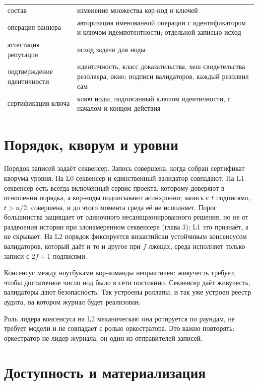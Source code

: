 \begin{center}
\begin{tabular}{p{3.4cm} p{10.2cm}}
состав & изменение множества кор-нод и ключей \\
операция раннера & авторизация именованной операции с идентификатором и ключом идемпотентности; отдельной записью исход \\
аттестация репутации & исход задачи для ноды \\
подтверждение идентичности & идентичность, класс доказательства, хеш свидетельства резолвера, окно; подписи валидаторов, каждый резолвил сам \\
сертификация ключа & ключ ноды, подписанный ключом идентичности, с началом и концом действия \\
\bottomrule
\end{tabular}
\end{center}

\section{Порядок, кворум и уровни}

Порядок записей задаёт секвенсер. Запись совершена, когда собран сертификат кворума уровня. На L0 секвенсер и единственный валидатор совпадают. На L1 секвенсер есть всегда включённый сервис проекта, которому доверяют в отношении порядка, а кор-ноды подписывают асинхронно; запись с $t$ подписями, $t > n/2$, совершена, и до этого момента среда её не исполняет. Порог большинства защищает от одиночного несанкционированного решения, но не от раздвоения истории при злонамеренном секвенсере (глава 3); L1 это признаёт, а не скрывает. На L2 порядок фиксируется византийски устойчивым консенсусом валидаторов, который даёт и то и другое при $f$ лжецах; среда исполняет только записи с $2f+1$ подписями.

\begin{whybox}
Консенсус между ноутбуками кор-команды непрактичен: живучесть требует, чтобы достаточное число нод было в сети постоянно. Секвенсер даёт живучесть, валидаторы дают безопасность. Так устроены роллапы, и так уже устроен реестр аудита, на котором журнал будет реализован.
\end{whybox}

Роль лидера консенсуса на L2 механическая: она ротируется по раундам, не требует модели и не совпадает с ролью оркестратора. Это важно повторять: оркестратор не лидер журнала, он один из отправителей записей.

\section{Доступность и материализация}

